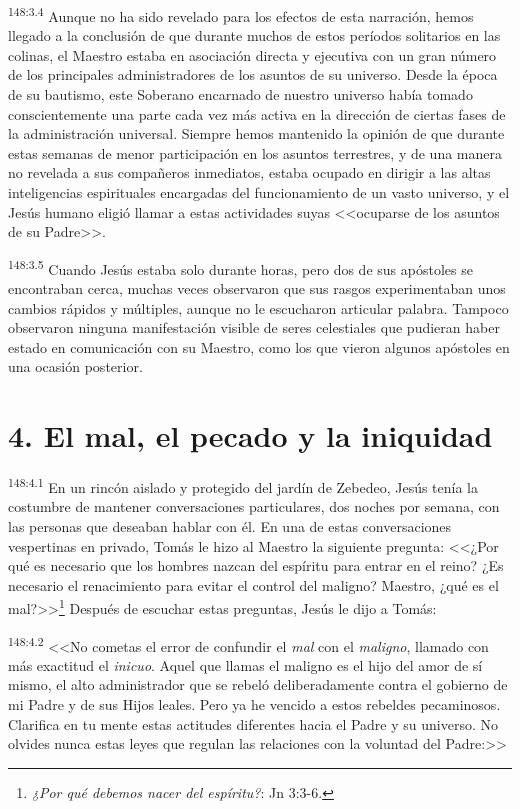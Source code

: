 \par 
\textsuperscript{148:3.4} Aunque no ha sido revelado para los efectos de esta narración, hemos llegado a la conclusión de que durante muchos de estos períodos solitarios en las colinas, el Maestro estaba en asociación directa y ejecutiva con un gran número de los principales administradores de los asuntos de su universo. Desde la época de su bautismo, este Soberano encarnado de nuestro universo había tomado conscientemente una parte cada vez más activa en la dirección de ciertas fases de la administración universal. Siempre hemos mantenido la opinión de que durante estas semanas de menor participación en los asuntos terrestres, y de una manera no revelada a sus compañeros inmediatos, estaba ocupado en dirigir a las altas inteligencias espirituales encargadas del funcionamiento de un vasto universo, y el Jesús humano eligió llamar a estas actividades suyas <<ocuparse de los asuntos de su Padre>>.

\par 
\textsuperscript{148:3.5} Cuando Jesús estaba solo durante horas, pero dos de sus apóstoles se encontraban cerca, muchas veces observaron que sus rasgos experimentaban unos cambios rápidos y múltiples, aunque no le escucharon articular palabra. Tampoco observaron ninguna manifestación visible de seres celestiales que pudieran haber estado en comunicación con su Maestro, como los que vieron algunos apóstoles en una ocasión posterior.

\section*{4. El mal, el pecado y la iniquidad}
\par 
\textsuperscript{148:4.1} En un rincón aislado y protegido del jardín de Zebedeo, Jesús tenía la costumbre de mantener conversaciones particulares, dos noches por semana, con las personas que deseaban hablar con él. En una de estas conversaciones vespertinas en privado, Tomás le hizo al Maestro la siguiente pregunta: <<¿Por qué es necesario que los hombres nazcan del espíritu para entrar en el reino? ¿Es necesario el renacimiento para evitar el control del maligno? Maestro, ¿qué es el mal?>>\footnote{\textit{¿Por qué debemos nacer del espíritu?}: Jn 3:3-6.} Después de escuchar estas preguntas, Jesús le dijo a Tomás:

\par 
\textsuperscript{148:4.2} <<No cometas el error de confundir el \textit{mal} con el \textit{maligno}, llamado con más exactitud el \textit{inicuo}. Aquel que llamas el maligno es el hijo del amor de sí mismo, el alto administrador que se rebeló deliberadamente contra el gobierno de mi Padre y de sus Hijos leales. Pero ya he vencido a estos rebeldes pecaminosos. Clarifica en tu mente estas actitudes diferentes hacia el Padre y su universo. No olvides nunca estas leyes que regulan las relaciones con la voluntad del Padre:>>

